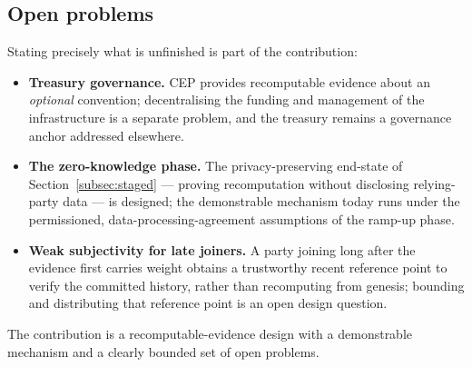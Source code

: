 \subsection{Open problems}
\label{subsec:open}

Stating precisely what is unfinished is part of the contribution:

\begin{itemize}
  \item \textbf{Treasury governance.} CEP provides recomputable evidence about an \emph{optional} convention; decentralising the funding and management of the infrastructure is a separate problem, and the treasury remains a governance anchor addressed elsewhere.
  \item \textbf{The zero-knowledge phase.} The privacy-preserving end-state of Section~\ref{subsec:staged} — proving recomputation without disclosing relying-party data — is designed; the demonstrable mechanism today runs under the permissioned, data-processing-agreement assumptions of the ramp-up phase.
  \item \textbf{Weak subjectivity for late joiners.} A party joining long after the evidence first carries weight obtains a trustworthy recent reference point to verify the committed history, rather than recomputing from genesis; bounding and distributing that reference point is an open design question.
\end{itemize}

The contribution is a recomputable-evidence design with a demonstrable mechanism and a clearly bounded set of open problems.

